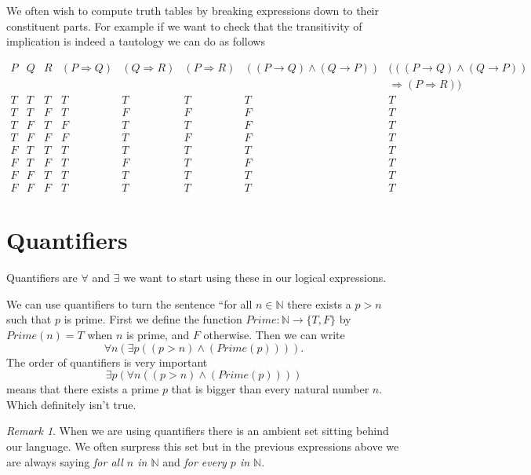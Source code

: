 \documentclass[
]{book}
\theoremstyle{definition}
\theoremstyle{definition}
\theoremstyle{definition}
\theoremstyle{definition}
\theoremstyle{remark}
\newtheorem*{remark}{Remark}
\begin{document}
We often wish to compute truth tables by breaking expressions down to their constituent parts. For example if we want to check that the transitivity of implication is indeed a tautology we can do as follows

\begin{equation}
\begin{array}{ccc|ccccc}
P & Q & R & (P \Rightarrow Q) & (Q \Rightarrow R) & (P \Rightarrow R) & ((P\rightarrow Q)\wedge (Q\rightarrow P)) & (((P\rightarrow Q)\wedge (Q\rightarrow P))\\
 \, & \, & \, & \, & \, & \, & \, &\Rightarrow (P \Rightarrow R)) \\
\hline
T & T & T & T & T & T & T & T\\
T & T & F & T & F & F & F & T\\
T & F & T & F & T & T & F & T\\
T & F & F & F & T & F & F & T\\
F & T & T & T & T & T & T & T\\
F & T & F & T & F & T & F & T\\
F & F & T & T & T & T & T & T\\
F & F & F & T & T & T & T & T
\end{array}
\end{equation}

\section{Quantifiers}\label{quantifiers}

Quantifiers are \(\forall\) and \(\exists\) we want to start using these in our logical expressions.

We can use quantifiers to turn the sentence ``for all \(n \in \mathbb{N}\) there exists a \(p > n\) such that \(p\) is prime. First we define the function \(Prime: \mathbb{N} \rightarrow \{T, F\}\) by \(Prime(n) =T\) when \(n\) is prime, and \(F\) otherwise. Then we can write
\[\forall n (\exists p((p>n)\wedge(Prime(p)))).  \]
The order of quantifiers is very important
\[\exists p (\forall n ((p>n)\wedge (Prime(p))))  \] means that there exists a prime \(p\) that is bigger than every natural number \(n\). Which definitely isn't true.

\begin{remark}
When we are using quantifiers there is an ambient set sitting behind our language. We often surpress this set but in the previous expressions above we are always saying \emph{for all \(n\) in \(\mathbb{N}\)} and \emph{for every \(p\) in \(\mathbb{N}\)}.
\end{remark}
\end{document}

